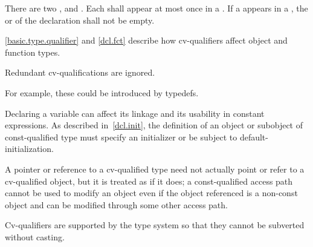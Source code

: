 \pnum
There are two ,  and
. Each  shall appear at most once in
a . If a  appears in a
, the 
or  of
the declaration shall not be empty.
\begin{note}
\ref{basic.type.qualifier} and \ref{dcl.fct} describe how cv-qualifiers affect object and
function types.
\end{note}
Redundant cv-qualifications are ignored.
\begin{note}
For example,
these could be introduced by typedefs.
\end{note}

\pnum
\begin{note}
Declaring a variable  can affect its linkage
and its usability in constant expressions. As
described in~\ref{dcl.init}, the definition of an object or subobject
of const-qualified type must specify an initializer or be subject to
default-initialization.
\end{note}

\pnum
A pointer or reference to a cv-qualified type need not actually point or
refer to a cv-qualified object, but it is treated as if it does; a
const-qualified access path cannot be used to modify an object even if
the object referenced is a non-const object and can be modified through
some other access path.
\begin{note}
Cv-qualifiers are supported by the type system so that they cannot be
subverted without casting.
\end{note}

